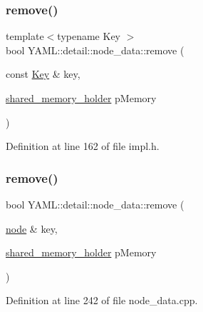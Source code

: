 \subsubsection{\texorpdfstring{remove()}{remove()}\hspace{0.1cm}{\footnotesize\ttfamily [1/2]}}
{\footnotesize\ttfamily template$<$typename Key $>$ \\
bool Y\+A\+M\+L\+::detail\+::node\+\_\+data\+::remove (\begin{DoxyParamCaption}\item[{const \mbox{\hyperlink{namespace_y_a_m_l_a67c320aa50d3de7ecba1d0b8775dd684a1af533fc24b0311b8c4d5ac2870283aa}{Key}} \&}]{key,  }\item[{\mbox{\hyperlink{namespace_y_a_m_l_1_1detail_a228c4b3b6ba1058b474d40afc218e21d}{shared\+\_\+memory\+\_\+holder}}}]{p\+Memory }\end{DoxyParamCaption})\hspace{0.3cm}{\ttfamily [inline]}}



Definition at line 162 of file impl.\+h.

\mbox{\label{class_y_a_m_l_1_1detail_1_1node__data_ab3b73a9b51d5d7063f46050e27dfeebc}} 
\subsubsection{\texorpdfstring{remove()}{remove()}\hspace{0.1cm}{\footnotesize\ttfamily [2/2]}}
{\footnotesize\ttfamily bool Y\+A\+M\+L\+::detail\+::node\+\_\+data\+::remove (\begin{DoxyParamCaption}\item[{\mbox{\hyperlink{class_y_a_m_l_1_1detail_1_1node}{node}} \&}]{key,  }\item[{\mbox{\hyperlink{namespace_y_a_m_l_1_1detail_a228c4b3b6ba1058b474d40afc218e21d}{shared\+\_\+memory\+\_\+holder}}}]{p\+Memory }\end{DoxyParamCaption})}



Definition at line 242 of file node\+\_\+data.\+cpp.

\mbox{\label{class_y_a_m_l_1_1detail_1_1node__data_aa048802eb103f716d0e4944fdb8dbf73}} 
